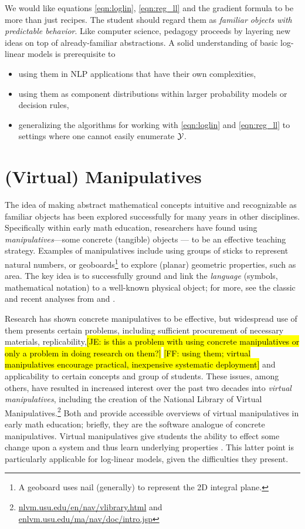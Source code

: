 \documentclass[11pt,letterpaper]{article}
\newcommand{\Note}[1]{}
\renewcommand{\Note}[1]{\hl{[#1]}}  %
\newcommand{\NoteSigned}[3]{{\sethlcolor{#2}\Note{#1: #3}}}
\newcommand{\NoteFF}[1]{\NoteSigned{FF}{LightBlue}{#1}}
\newcommand{\NoteJE}[1]{\NoteSigned{JE}{LightGreen}{#1}}
\begin{document}
We would like equations \eqref{eqn:loglin}, \eqref{eqn:reg_ll} and the
gradient formula to be more than just recipes.  The student should
regard them as {\em familiar objects with predictable behavior}.  Like
computer science, pedagogy proceeds by layering new ideas on top of
already-familiar abstractions.  A solid understanding of basic
log-linear models is prerequisite to 
\begin{itemize}
\item using them in NLP applications that have their own complexities, 
\item using them as component distributions within larger probability
  models or decision rules,
\item generalizing the algorithms for working with \eqref{eqn:loglin}
  and \eqref{eqn:reg_ll} to settings where one cannot easily enumerate
  ${\cal Y}$.
\end{itemize}

\section{(Virtual) Manipulatives}
The idea of making abstract mathematical concepts intuitive and recognizable as familiar objects 
has been explored successfully for many years in other disciplines. Specifically within early 
math education, researchers have found using \textit{manipulatives}---some concrete (tangible) 
objects --- to be an effective teaching strategy. Examples of manipulatives include using groups of 
sticks to represent natural numbers, or geoboards\footnote{A geoboard uses nail (generally) to represent 
the 2D integral plane.} to explore (planar) geometric properties, such as area. The key idea is to 
successfully ground and link the \textit{language} (symbols, mathematical notation) to a well-known physical 
object; for more, see the classic and recent analyses from
 and .

Research has shown concrete manipulatives to be effective, but widespread use of them presents certain 
problems, including sufficient procurement of necessary materials, replicability,\NoteJE{is this a problem
  with using concrete manipulatives or only a problem in doing
  research on them?} \NoteFF{using them; virtual manipulatives encourage practical, inexpensive systematic 
deployment} and applicability to certain concepts and group of students. These issues, among others, have 
resulted in increased interest over the past two decades into \textit{virtual manipulatives}, including the creation of 
the National Library of Virtual Manipulatives.\footnote{\url{nlvm.usu.edu/en/nav/vlibrary.html} and 
\url{enlvm.usu.edu/ma/nav/doc/intro.jsp}} 
Both  and  provide accessible overviews of 
virtual manipulatives in early math education; briefly, they are the software analogue of concrete manipulatives. Virtual manipulatives give students the 
ability to effect some change upon a system and thus learn underlying properties \cite{moyer2002virtual}.
This latter point is particularly applicable for log-linear models, given the difficulties they present.
\end{document}
